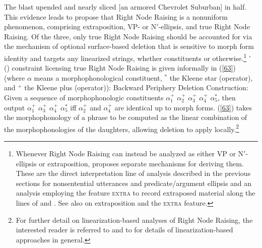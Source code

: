 \ex The blast upended and nearly sliced [an armored Chevrolet Suburban] in half.\label{62}\zl
%
This evidence leads \citet{Chaves2014} to propose that Right Node Raising is a nonuniform phenomenon, comprising extraposition,  VP- or N$'$-ellipsis, and true Right Node Raising.
%
%
%
Of the three, only true Right Node Raising should be accounted for via the mechanism of optional surface-based deletion that is sensitive to morph form identity and targets any linearized strings, whether constituents or otherwise.\footnote{Whenever Right Node Raising can instead be analyzed as either VP or N$'$-ellipsis or extraposition, \citet{Chaves2014} proposes separate mechanisms for deriving them. These are the direct interpretation line of analysis described in the previous sections for nonsentential utterances and predicate/argument ellipsis and an analysis employing the feature \textsc{extra} to record extraposed material along the lines of \citet{KimSag2005} and \citet{Kay2012}. See also  on extraposition and the \textsc{extra} feature.} \citeauthor{Chaves2014}' (\citeyear[874]{Chaves2014}) constraint licensing true Right Node Raising is given informally in (\ref{63}) (where $\alpha$ means a morphophonological constituent, $^{*}$ the Kleene star (operator), and $^{+}$ the Kleene plus (operator)):
%
%
%
\eanoraggedright
\label{63}
Backward Periphery Deletion Construction:\\
Given a sequence of morphophonologic constituents $\alpha_{1}^{+}$ $\alpha_{2}^{+}$ $\alpha_{3}^{+}$ $\alpha_{4}^{+}$ $\alpha_{5}^{*}$, then output
$\alpha_{1}^{+}$ $\alpha_{3}^{+}$ $\alpha_{4}^{+}$ $\alpha_{5}^{*}$
iff $\alpha_{2}^{+}$ and $\alpha_{4}^{+}$ are identical up to morph forms.
\z
(\ref{63}) takes the morphophonology of a phrase to be computed as the linear combination of the morphophonologies of the daughters, allowing deletion to apply locally.\footnote{For further detail on linearization-based analyses of Right Node Raising, the interested reader is referred to \citet{Yatabe2001, Yatabe2012} and to  for details of linearization-based approaches in general.}
